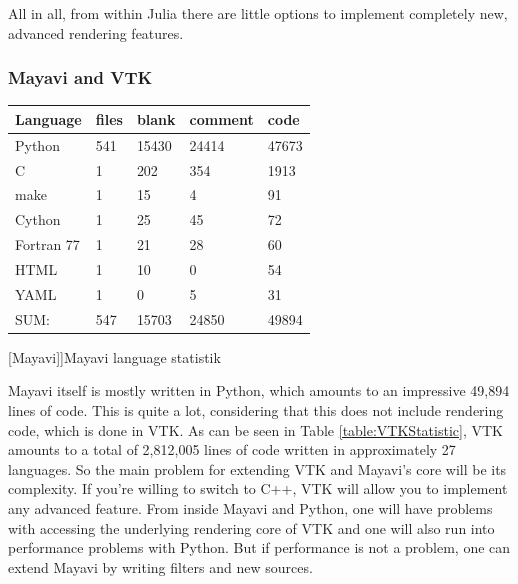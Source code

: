 {All in all, from within Julia there are little options to implement completely new, advanced rendering features.

\subsubsection{Mayavi and VTK}
\begin{table}[htbp]
    \centering
    \begin{tabular}{l|l|l|l|l}
        \hline
        \textbf{Language} &    \textbf{files} &    \textbf{blank} &  \textbf{comment} &  \textbf{code}\\
        \hline
        Python          &               541      &    15430     &    24414   &       47673\\
        C               &                 1      &     202      &      354   &      1913\\
        make            &                 1      &       15     &         4  &        91\\
        Cython          &                 1      &       25     &        45  &        72\\
        Fortran 77      &                 1      &       21     &        28  &        60\\
        HTML            &                 1      &       10     &         0  &        54\\
        YAML            &                 1      &        0     &        5   &       31\\
        \hline
        SUM:            &               547       &   15703     &     24850  &       49894\\
        \hline
        \end{tabular}
    [Mayavi]]{Mayavi language statistik}
    \label{table:mayavistatistic}
\end{table}

Mayavi itself is mostly written in Python, which amounts to an impressive 49,894 lines of code. This is quite a lot, considering that this does not include rendering code, which is done in VTK.
As can be seen in Table \cref{table:VTKStatistic}, VTK amounts to a total of 2,812,005 lines of code written in approximately 27 languages. 
So the main problem for extending VTK and Mayavi's core will be its complexity. If you're willing to switch to C++, VTK will allow you to implement any advanced feature. From inside Mayavi and Python, one will have problems with accessing the underlying rendering core of VTK and one will also run into performance problems with Python.
But if performance is not a problem, one can extend Mayavi by writing filters and new sources\cite{MayaviExtension}.


}
